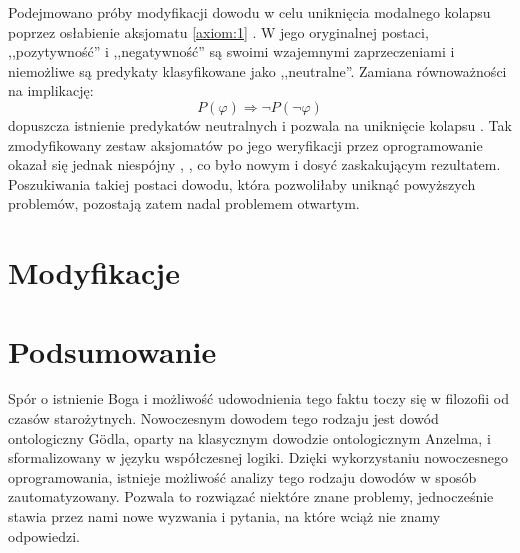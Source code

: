 \documentclass{eiti-raport}
\begin{document}
Podejmowano próby modyfikacji dowodu w celu uniknięcia modalnego kolapsu poprzez osłabienie aksjomatu \ref{axiom:1} \cite{anderson1990}. W jego oryginalnej postaci, ,,pozytywność'' i ,,negatywność'' są swoimi wzajemnymi zaprzeczeniami i niemożliwe są predykaty klasyfikowane jako ,,neutralne''. Zamiana równoważności na implikację:
\begin{equation*}
	P(\varphi) \Rightarrow \neg P( \neg \varphi )
\end{equation*}
dopuszcza istnienie predykatów neutralnych i pozwala na uniknięcie kolapsu \cite{anderson1996}. Tak zmodyfikowany zestaw aksjomatów po jego weryfikacji przez oprogramowanie okazał się jednak niespójny \cite{benzmuller2014}, \cite{benzmuller2016}, co było nowym i dosyć zaskakującym rezultatem. Poszukiwania takiej postaci dowodu, która pozwoliłaby uniknąć powyższych problemów, pozostają zatem nadal problemem otwartym. 

\section{Modyfikacje} \label{sec:modyfikacje}


\section{Podsumowanie} \label{sec:summary}
Spór o istnienie Boga i możliwość udowodnienia tego faktu toczy się w filozofii od czasów starożytnych. Nowoczesnym dowodem tego rodzaju jest dowód ontologiczny G\"odla, oparty na klasycznym dowodzie ontologicznym Anzelma, i sformalizowany w języku współczesnej logiki. Dzięki wykorzystaniu nowoczesnego oprogramowania, istnieje możliwość analizy tego rodzaju dowodów w sposób zautomatyzowany. Pozwala to rozwiązać niektóre znane problemy, jednocześnie stawia przez nami nowe wyzwania i pytania, na które wciąż nie znamy odpowiedzi. 

\newpage


\end{document}
